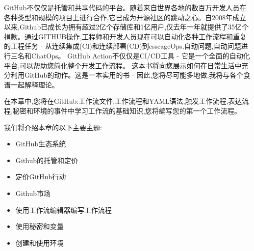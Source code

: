 GitHub不仅仅是托管和共享代码的平台。随着来自世界各地的数百万开发人员在各种类型和规模的项目上进行合作,它已成为开源社区的跳动之心。自2008年成立以来,Github已成长为拥有超过2亿个存储库和1亿用户,仅去年一年就提供了35亿个捐款。通过GITHUB操作,工程师和开发人员现在可以自动化各种工作流程和重复的工程任务 - 从连续集成(CI)和连续部署(CD)到esseageOps,自动问题,自动问题进行三名和ChatOps。 GitHub Action不仅仅是CI/CD工具 - 它是一个全面的自动化平台,可以帮助您简化整个开发工作流程。
这本书将向您展示如何在日常生活中充分利用GitHub的动作。这是一本实用的书 - 因此,您将尽可能多地做,我将与各个食谱一起解释理论。

在本章中,您将在GitHub:工作流文件,工作流程和YAML语法,触发工作流程,表达流程,秘密和环境的事件中学习工作流的基础知识,您将编写您的第一个工作流程。

我们将介绍本章的以下主要主题:

\begin{itemize}
\item 
GitHub生态系统

\item 
Github的托管和定价

\item 
定价GitHub行动

\item 
Github市场

\item 
使用工作流编辑器编写工作流程

\item 
使用秘密和变量

\item 
创建和使用环境
\end{itemize}